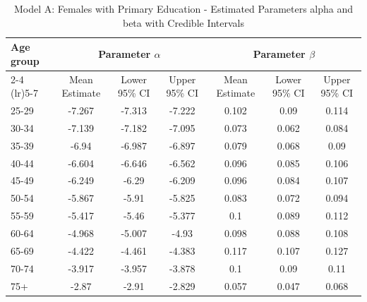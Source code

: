 \begin{landscape}
\begin{table}[htbp]
\centering
\caption{Model A: Females with Primary Education - Estimated Parameters alpha and beta with Credible Intervals}
\label{tab:parameters_ab2}
\begin{tabular}{@{}lcccccc@{}}
\toprule
Age group & \multicolumn{3}{c}{Parameter \(\alpha\)} & \multicolumn{3}{c}{Parameter \(\beta\)} \\ 
\cmidrule(lr){2-4} \cmidrule(lr){5-7}
          & Mean Estimate & Lower 95\% CI & Upper 95\% CI & Mean Estimate & Lower 95\% CI & Upper 95\% CI \\ 
\midrule
25-29 & -7.267 & -7.313 & -7.222 & 0.102 & 0.09 & 0.114 \\
30-34 & -7.139 & -7.182 & -7.095 & 0.073 & 0.062 & 0.084 \\
35-39 & -6.94 & -6.987 & -6.897 & 0.079 & 0.068 & 0.09 \\
40-44 & -6.604 & -6.646 & -6.562 & 0.096 & 0.085 & 0.106 \\
45-49 & -6.249 & -6.29 & -6.209 & 0.096 & 0.084 & 0.107 \\
50-54 & -5.867 & -5.91 & -5.825 & 0.083 & 0.072 & 0.094 \\
55-59 & -5.417 & -5.46 & -5.377 & 0.1 & 0.089 & 0.112 \\
60-64 & -4.968 & -5.007 & -4.93 & 0.098 & 0.088 & 0.108 \\
65-69 & -4.422 & -4.461 & -4.383 & 0.117 & 0.107 & 0.127 \\
70-74 & -3.917 & -3.957 & -3.878 & 0.1 & 0.09 & 0.11 \\
75+ & -2.87 & -2.91 & -2.829 & 0.057 & 0.047 & 0.068 \\
\bottomrule
\end{tabular}
\end{table}
\end{landscape}
